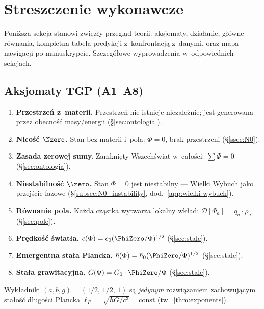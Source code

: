 \section*{Streszczenie wykonawcze}\label{sec:executive-summary}

\noindent
Poni\.zsza sekcja stanowi zwi\k{e}z\l{}y przegl\k{a}d teorii:
aksjomaty, dzia\l{}anie, g\l{}\'owne r\'ownania, kompletna tabela
predykcji z~konfrontacj\k{a} z~danymi, oraz mapa nawigacji po
manuskrypcie. Szczeg\'o\l{}owe wyprowadzenia w~odpowiednich sekcjach.

\subsection*{Aksjomaty TGP (A1--A8)}

\begin{enumerate}[label=\textbf{A\arabic*}.,leftmargin=2em]
\item \textbf{Przestrze\'n z~materii.}
  Przestrze\'n nie istnieje niezale\.znie; jest generowana
  przez obecno\'s\'c masy/energii (\S\ref{sec:ontologia}).
\item \textbf{Nico\'s\'c $\Nzero$.}
  Stan bez materii i~pola: $\Phi = 0$, brak przestrzeni (\S\ref{ssec:N0}).
\item \textbf{Zasada zerowej sumy.}
  Zamkni\k{e}ty Wszech\'swiat w~ca\l{}o\'sci: $\sum \Phi = 0$ (\S\ref{sec:ontologia}).
\item \textbf{Niestabilno\'s\'c $\Nzero$.}
  Stan $\Phi = 0$ jest niestabilny --- Wielki Wybuch jako
  przej\'scie fazowe (\S\ref{subsec:N0_instability}, dod.~\ref{app:wielki-wybuch}).
\item \textbf{R\'ownanie pola.}
  Ka\.zda cz\k{a}stka wytwarza lokalny wk\l{}ad:
  $\mathcal{D}[\Phi_a] = q_a \cdot \rho_a$ (\S\ref{sec:pole}).
\item \textbf{Pr\k{e}dko\'s\'c \'swiat\l{}a.}
  $c(\Phi) = c_0 (\PhiZero/\Phi)^{1/2}$ (\S\ref{sec:stale}).
\item \textbf{Emergentna sta\l{}a Plancka.}
  $\hbar(\Phi) = \hbar_0 (\PhiZero/\Phi)^{1/2}$ (\S\ref{sec:stale}).
\item \textbf{Sta\l{}a grawitacyjna.}
  $G(\Phi) = G_0 \cdot \PhiZero/\Phi$ (\S\ref{sec:stale}).
\end{enumerate}
\noindent
Wyk\l{}adniki $(a, b, g) = (1/2,\, 1/2,\, 1)$ s\k{a}
\emph{jedynym} rozwi\k{a}zaniem
zachowuj\k{a}cym sta\l{}o\'s\'c d\l{}ugo\'sci Plancka
$\ell_P = \sqrt{\hbar G/c^3} = \mathrm{const}$
(tw.~\ref{thm:exponents}).


